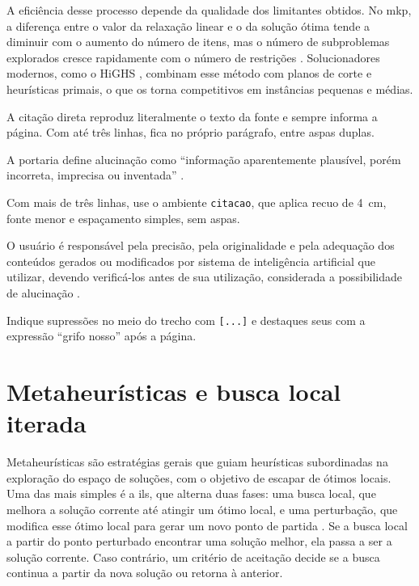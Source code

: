 A eficiência desse processo depende da qualidade dos limitantes obtidos. No
\acs{mkp}, a diferença entre o valor da relaxação linear e o da solução ótima
tende a diminuir com o aumento do número de itens, mas o número de subproblemas
explorados cresce rapidamente com o número de restrições
\cite{puchinger2010multidimensional}. Solucionadores modernos, como o HiGHS
\cite{huangfu2018parallelizing}, combinam esse método com planos de corte e
heurísticas primais, o que os torna competitivos em instâncias pequenas e
médias.

\begin{instrucao}
A citação direta reproduz literalmente o texto da fonte e sempre informa a
página. Com até três linhas, fica no próprio parágrafo, entre aspas duplas.
\begin{exemplo}
A portaria define alucinação como
``informação aparentemente plausível,
porém incorreta, imprecisa ou
inventada'' \cite[p.~1]{ufes2026portaria}.
\end{exemplo}
Com mais de três linhas, use o ambiente \verb|citacao|, que aplica recuo de
4~cm, fonte menor e espaçamento simples, sem aspas.
\begin{exemplo}
\begin{citacao}
O usuário é responsável pela precisão,
pela originalidade e pela adequação dos
conteúdos gerados ou modificados por
sistema de inteligência artificial que
utilizar, devendo verificá-los antes de
sua utilização, considerada a
possibilidade de alucinação
\cite[p.~5]{ufes2026portaria}.
\end{citacao}
\end{exemplo}
Indique supressões no meio do trecho com \verb|[...]| e destaques seus com a
expressão ``grifo nosso'' após a página.
\end{instrucao}

\section{Metaheurísticas e busca local iterada}
\label{sec:fundamentacao:ils}

Metaheurísticas são estratégias gerais que guiam heurísticas subordinadas na
exploração do espaço de soluções, com o objetivo de escapar de ótimos locais.
Uma das mais simples é a \ac{ils}, que alterna duas fases: uma busca local, que
melhora a solução corrente até atingir um ótimo local, e uma perturbação, que
modifica esse ótimo local para gerar um novo ponto de partida
\cite{lourenco2019iterated}. Se a busca local a partir do ponto perturbado
encontrar uma solução melhor, ela passa a ser a solução corrente. Caso
contrário, um critério de aceitação decide se a busca continua a partir da
nova solução ou retorna à anterior.

